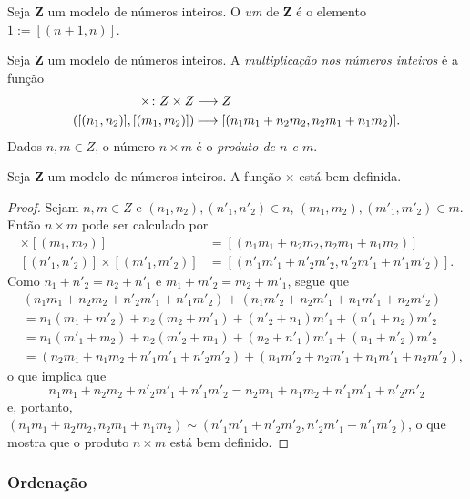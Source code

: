 \begin{definition}
	Seja $\bm Z$ um modelo de números inteiros. O \emph{um} de $\bm Z$ é o elemento $1 := [(n+1,n)]$.
\end{definition}

\begin{definition}
Seja $\bm Z$ um modelo de números inteiros. A \emph{multiplicação nos números inteiros} é a função
	\begin{align*}
	{\times}\colon {Z \times Z} &\longrightarrow {Z} \\{([(n_1,n_2)],[(m_1,m_2)])} &\longmapsto [(n_1 m_1 + n_2 m_2,n_2 m_1+n_1 m_2)].
	\end{align*}
Dados $n,m \in Z$, o número $n \times m$ é o \emph{produto de $n$ e $m$}.
\end{definition}

\begin{theorem}
	Seja $\bm Z$ um modelo de números inteiros. A função $\times$ está bem definida.
\end{theorem}
\begin{proof}
	Sejam $n,m \in Z$ e $(n_1,n_2),(n'_1,n'_2) \in n$, $(m_1,m_2),(m'_1,m'_2) \in m$. Então $n \times m$ pode ser calculado por
\begin{align*}
	[(n_1,n_2)] \times [(m_1,m_2)] &= [(n_1 m_1 + n_2 m_2,n_2 m_1+n_1 m_2)] \\
	[(n'_1,n'_2)]\times [(m'_1,m'_2)] &= [(n'_1 m'_1 + n'_2 m'_2,n'_2 m'_1+n'_1 m'_2)].
	\end{align*}
Como $n_1+n'_2=n_2+n'_1$ e $m_1+m'_2=m_2+m'_1$, segue que
	\begin{align*}
	&(n_1 m_1 + n_2 m_2+n'_2 m'_1+n'_1 m'_2)+(n_1 m'_2 + n_2 m'_1 + n_1 m'_1+n_2 m'_2) \\
	&= n_1(m_1+m'_2)+n_2(m_2+m'_1)+(n'_2+n_1)m'_1+(n'_1+n_2)m'_2 \\
	&= n_1(m'_1+m_2)+n_2(m'_2+m_1)+(n_2+n'_1)m'_1+(n_1+n'_2)m'_2 \\
	&= (n_2 m_1+n_1 m_2+n'_1 m'_1 + n'_2 m'_2)+(n_1 m'_2 + n_2 m'_1 + n_1 m'_1+n_2 m'_2),
	\end{align*}
o que implica que
	\begin{equation*}
	n_1 m_1 + n_2 m_2+n'_2 m'_1+n'_1 m'_2=n_2 m_1+n_1 m_2+n'_1 m'_1 + n'_2 m'_2
	\end{equation*}
e, portanto, $(n_1 m_1 + n_2 m_2,n_2 m_1+n_1 m_2) \sim (n'_1 m'_1 + n'_2 m'_2,n'_2 m'_1+n'_1 m'_2)$, o que mostra que o produto $n \times m$ está bem definido.
\end{proof}

\subsubsection{Ordenação}

